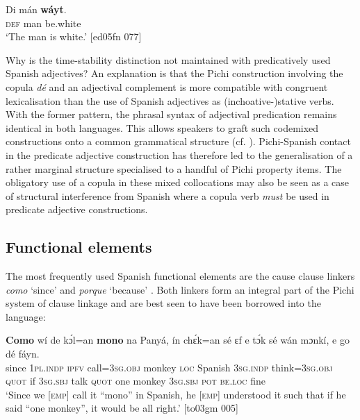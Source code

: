 \ea%
    \label{ex:key:1722}
    \gll Di  mán    \textbf{wáyt}.\\
\textsc{def}  man    be.white\\

\glt ‘The man is white.’ [ed05fn 077]
\z

Why is the time-stability distinction not maintained with predicatively used Spanish adjectives? An explanation is that the Pichi construction involving the copula \textit{dé} and an adjectival complement is more compatible with congruent lexicalisation than the use of Spanish adjectives as (inchoative-)stative verbs. With the former pattern, the phrasal syntax of adjectival predication remains identical in both languages. This allows speakers to graft such codemixed constructions onto a common grammatical structure (cf. \citealt{MeechanPoplack1995}). Pichi-Spanish contact in the predicate adjective construction has therefore led to the generalisation of a rather marginal structure specialised to a handful of Pichi property items. The obligatory use of a copula in these mixed collocations may also be seen as a case of structural interference from Spanish where a copula verb \textit{must} be used in predicate adjective constructions. 

\subsection{Functional elements}\label{sec:13.2.3}

The most frequently used Spanish functional elements are the cause clause linkers \textit{como} ‘since’  and \textit{porque} ‘because’ . Both linkers form an integral part of the Pichi system of clause linkage and are best seen to have been borrowed into the language:


\ea%
    \label{ex:key:1723}
    \gll \textbf{Como}  wí    de  kɔ́l=an    \textbf{mono}  na  Panyá,  ín    chɛ́k=an
sé    ɛf  e    tɔ́k  sé    wán  mɔnkí,  e    go  dé    fáyn.\\
since  \textsc{1pl.indp}  \textsc{ipfv}  call=\textsc{3sg.obj}  monkey  \textsc{loc}  Spanish  \textsc{3sg.indp}  think=\textsc{3sg.obj}
\textsc{quot}    if  \textsc{3sg.sbj}  talk  \textsc{quot}    one  monkey  \textsc{3sg.sbj}  \textsc{pot}  \textsc{be.loc}  fine\\

\glt ‘Since we \textsc{[emp]} call it “mono” in Spanish, he \textsc{[emp]} understood it such 
that if he said “one monkey”, it would be all right.’ [to03gm 005]
\z


